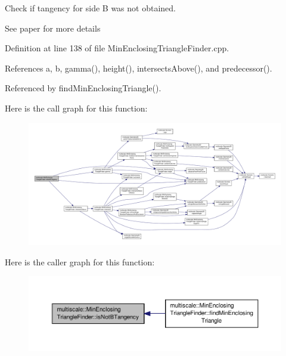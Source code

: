 Check if tangency for side B was not obtained. 

See paper for more details 

Definition at line 138 of file Min\-Enclosing\-Triangle\-Finder.\-cpp.



References a, b, gamma(), height(), intersects\-Above(), and predecessor().



Referenced by find\-Min\-Enclosing\-Triangle().



Here is the call graph for this function\-:\nopagebreak
\begin{figure}[H]
\begin{center}
\leavevmode
\includegraphics[width=350pt]{classmultiscale_1_1MinEnclosingTriangleFinder_a9f071f42dbaff51c8975da1b77c1188e_cgraph}
\end{center}
\end{figure}




Here is the caller graph for this function\-:\nopagebreak
\begin{figure}[H]
\begin{center}
\leavevmode
\includegraphics[width=350pt]{classmultiscale_1_1MinEnclosingTriangleFinder_a9f071f42dbaff51c8975da1b77c1188e_icgraph}
\end{center}
\end{figure}


